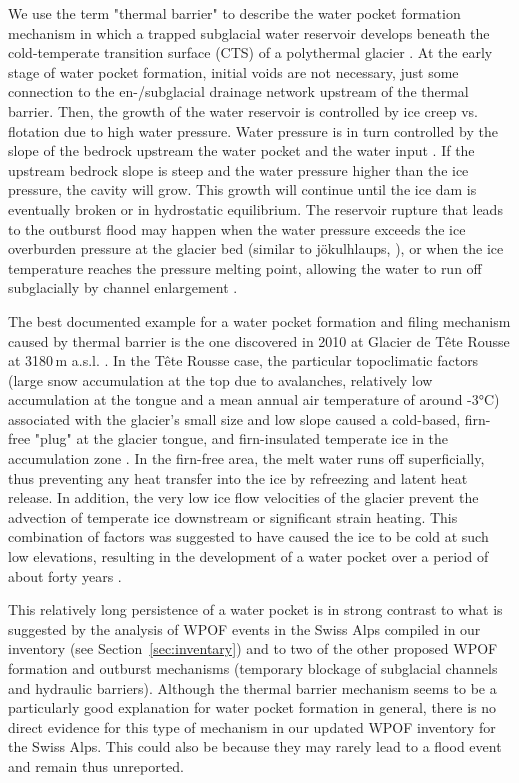 We use the term "thermal barrier" to describe the water pocket formation mechanism in which a trapped subglacial water reservoir develops beneath the cold-temperate transition surface (CTS) of a polythermal glacier \citep[Fig.~\ref{fig:WPthermo}; see][for a review on the hydrology of polythermal glaciers]{Irvine&al2011}. At the early stage of water pocket formation, initial voids are not necessary, just some connection to the en-/subglacial drainage network upstream of the thermal barrier. Then, the growth of the water reservoir is controlled by ice creep vs. flotation due to high water pressure. Water pressure is in turn controlled by the slope of the bedrock upstream the water pocket and the water input \citep{Vincent&al2015}. If the upstream bedrock slope is steep and the water pressure higher than the ice pressure, the cavity will grow. This growth will continue until the ice dam is eventually broken or in hydrostatic equilibrium. The reservoir rupture that leads to the outburst flood may happen when the water pressure exceeds the ice overburden pressure at the glacier bed (similar to jökulhlaups, \cite{Bjornsson2010}), or when the ice temperature reaches the pressure melting point, allowing the water to run off subglacially by channel enlargement \citep[e.g.][]{Vincent&al2010b}.  

The best documented example for a water pocket formation and filing mechanism caused by thermal barrier is the one discovered in 2010 at Glacier de Tête Rousse at 3180\,m a.s.l. \citep{Vincent&al2012,Gilbert&al2012,Vincent&al2015}. In the Tête Rousse case, the particular topoclimatic factors (large snow accumulation at the top due to avalanches, relatively low accumulation at the tongue and a mean annual air temperature of around -3°C) associated with the glacier's small size and low slope caused a cold-based, firn-free "plug" at the glacier tongue, and firn-insulated temperate ice in the accumulation zone \citep{Gilbert&al2012}. In the firn-free area, the melt water runs off superficially, thus preventing any heat transfer into the ice by refreezing and latent heat release. In addition, the very low ice flow velocities of the glacier prevent the advection of temperate ice downstream or significant strain heating. This combination of factors was suggested to have caused the ice to be cold at such low elevations, resulting in the development of a water pocket over a period of about forty years \citep{Gilbert&al2012}. 

This relatively long persistence of a water pocket is in strong contrast to what is suggested by the analysis of WPOF events in the Swiss Alps compiled in our inventory (see Section~\ref{sec:inventary}) and to two of the other proposed WPOF formation and outburst mechanisms (temporary blockage of subglacial channels and hydraulic barriers). Although the thermal barrier mechanism seems to be a particularly good explanation for water pocket formation in general, there is no direct evidence for this type of mechanism in our updated WPOF inventory for the Swiss Alps. This could also be because they may rarely lead to a flood event and remain thus unreported. 

